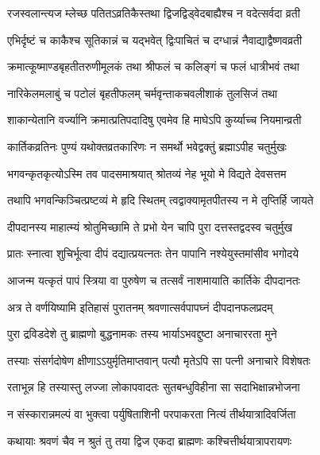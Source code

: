 \twolineshloka
{रजस्वलान्त्यज म्लेच्छ पतितऽव्रतिकैस्तथा}
{द्विजद्विड्वेदबाह्यैश्च न वदेत्सर्वदा व्रती} %

\twolineshloka
{एभिर्दृष्टं च काकैश्च सूतिकान्नं च यद्भवेत्}
{द्विःपाचितं च दग्धान्नं नैवाद्याद्वैष्णवव्रती} %

\twolineshloka
{क्रमात्कूष्माण्डबृहतीतरुणीमूलकं तथा}
{श्रीफलं च कलिङ्गं च फलं धात्रीभवं तथा} %

\twolineshloka
{नारिकेलमलाबुं च पटोलं बृहतीफलम्}
{चर्मवृन्ताकचवलीशाकं तुलसिजं तथा} %

\twolineshloka
{शाकान्येतानि वर्ज्यानि क्रमात्प्रतिपदादिषु}
{एवमेव हि माघेऽपि कुर्य्याच्च नियमान्व्रती} %

\twolineshloka
{कार्तिकव्रतिनः पुण्यं यथोक्तव्रतकारिणः}
{न समर्थो भवेद्वक्तुं ब्रह्माऽपीह चतुर्मुखः} %





\twolineshloka
{भगवन्कृतकृत्योऽस्मि तव पादसमाश्रयात्}
{श्रोतव्यं नेह भूयो मे विद्यते देवसत्तम} %

\twolineshloka
{तथापि भगवन्किञ्चित्प्रष्टव्यं मे हृदि स्थितम्}
{त्वद्वाक्यामृतपीतस्य न मे तृप्तिर्हि जायते} %

\twolineshloka
{दीपदानस्य माहात्म्यं श्रोतुमिच्छामि ते प्रभो}
{येन चापि पुरा दत्तस्तद्वदस्व चतुर्मुख} %


\twolineshloka
{प्रातः स्नात्वा शुचिर्भूत्वा दीपं दद्यात्प्रयत्नतः}
{तेन पापानि नश्येयुस्तमांसीव भगोदये} %

\twolineshloka
{आजन्म यत्कृतं पापं स्त्रिया वा पुरुषेण च}
{तत्सर्वं नाशमायाति कार्तिके दीपदानतः} %

\twolineshloka
{अत्र ते वर्णयिष्यामि इतिहासं पुरातनम्}
{श्रवणात्सर्वपापघ्नं दीपदानफलप्रदम्} %

\twolineshloka
{पुरा द्रविडदेशे तु ब्राह्मणो बुद्धनामकः}
{तस्य भार्याऽभवद्दुष्टा अनाचाररता मुने} %

\twolineshloka
{तस्याः संसर्गदोषेण क्षीणाऽऽयुर्मृतिमाप्तवान्}
{पत्यौ मृतेऽपि सा पत्नी अनाचारे विशेषतः} %

\twolineshloka
{रताभून्न हि तस्यास्तु लज्जा लोकापवादतः}
{सुतबन्धुविहीना सा सदाभिक्षान्नभोजना} %

\twolineshloka
{न संस्कारान्नमल्पं वा भुक्त्वा पर्युषिताशिनी}
{परपाकरता नित्यं तीर्थयात्रादिवर्जिता} %

\twolineshloka
{कथायाः श्रवणं चैव न श्रुतं तु तया द्विज}
{एकदा ब्राह्मणः कश्चित्तीर्थयात्रापरायणः} %

